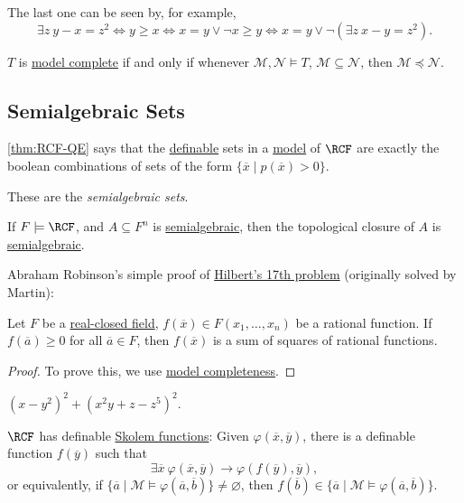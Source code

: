 The last one can be seen by, for example,
\[
	\exists z\ y - x = z^2
	\iff y \geq x
	\iff x = y \lor \lnot x \geq y
	\iff x = y \lor \lnot (\exists z\ x - y = z^2).
\]

\begin{lemma}
	\(T\) is \hyperref[def:model-complete]{model complete} if and only if whenever \(\mathcal{M} , \mathcal{N} \models T\), \(\mathcal{M} \subseteq \mathcal{N} \), then \(\mathcal{M} \preceq \mathcal{N} \).
\end{lemma}

\subsection{Semialgebraic Sets}
\autoref{thm:RCF-QE} says that the \hyperref[def:definable]{definable} sets in a \hyperref[def:model]{model} of \(\RCF\) are exactly the boolean combinations of sets of the form \(\{ \overline{x} \mid p(\overline{x} ) > 0 \} \).

\begin{definition}[Semialgebraic]\label{def:semialgebraic}
	These are the \emph{semialgebraic sets}.
\end{definition}

\begin{corollary}
	If \(F \models \RCF\), and \(A \subseteq F^n\) is \hyperref[def:semialgebraic]{semialgebraic}, then the topological closure of \(A\) is \hyperref[def:semialgebraic]{semialgebraic}.
\end{corollary}

Abraham Robinson's simple proof of \hyperref[prb:Hilbert-17th]{Hilbert's 17th problem} (originally solved by Martin):

\begin{problem}\label{prb:Hilbert-17th}
Let \(F\) be a \hyperref[prev:real-closed-field]{real-closed field}, \(f(\overline{x} )\in F(x_1, \dots , x_n)\) be a rational function. If \(f(\overline{a} ) \geq 0\) for all \(\overline{a} \in F\), then \(f(\overline{x} )\) is a sum of squares of rational functions.
\end{problem}
\begin{proof}
	To prove this, we use \hyperref[def:model-complete]{model completeness}.
\end{proof}

\begin{eg}
	\((x - y^2) ^2 + (x^2 y + z - z^5)^2\).
\end{eg}


\begin{theorem}
	\(\RCF\) has definable \hyperref[def:built-in-Skolem-function]{Skolem functions}: Given \(\varphi (\overline{x} , \overline{y} )\), there is a definable function \(f(\overline{y} )\) such that
	\[
		\exists \overline{x} \ \varphi (\overline{x} , \overline{y} ) \to \varphi (f(\overline{y} ), \overline{y} ),
	\]
	or equivalently, if \(\{ \overline{a} \mid \mathcal{M} \models \varphi (\overline{a} , \overline{b} ) \} \neq \varnothing \), then \(f(\overline{b} )\in \{ \overline{a} \mid \mathcal{M} \models \varphi (\overline{a} , \overline{b} ) \} \).
\end{theorem}

